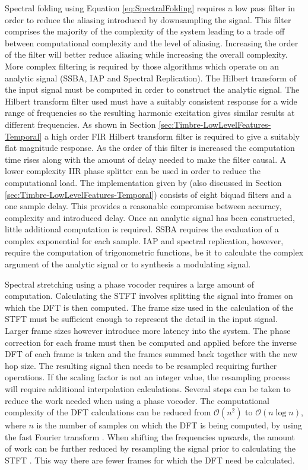 		Spectral folding using Equation \ref{eq:SpectralFolding} requires a low pass filter in order to reduce the
		aliasing introduced by downsampling the signal. This filter comprises the majority of the complexity of the
		system leading to a trade off between computational complexity and the level of aliasing. Increasing the
		order of the filter will better reduce aliasing while increasing the overall complexity. More complex
		filtering is required by those algorithms which operate on an analytic signal (SSBA, IAP and Spectral
		Replication). The Hilbert transform of the input signal must be computed in order to construct the analytic
		signal. The Hilbert transform filter used must have a suitably consistent response for a wide range of
		frequencies so the resulting harmonic excitation gives similar results at different frequencies. As shown
		in Section \ref{sec:Timbre-LowLevelFeatures-Temporal} a high order FIR Hilbert transform filter is required
		to give a suitably flat magnitude response. As the order of this filter is increased the computation time
		rises along with the amount of delay needed to make the filter causal. A lower complexity IIR phase
		splitter can be used in order to reduce the computational load. The implementation given by
		\citet{niemitalo2003hilbert} (also discussed in Section \ref{sec:Timbre-LowLevelFeatures-Temporal})
		consists of eight biquad filters and a one sample delay. This provides a reasonable compromise between
		accuracy, complexity and introduced delay.  Once an analytic signal has been constructed, little additional
		computation is required. SSBA requires the evaluation of a complex exponential for each sample. IAP and
		spectral replication, however, require the computation of trigonometric functions, be it to calculate the
		complex argument of the analytic signal or to synthesis a modulating signal.

		Spectral stretching using a phase vocoder requires a large amount of computation. Calculating the STFT
		involves splitting the signal into frames on which the DFT is then computed. The frame size used in the
		calculation of the STFT must be sufficient enough to represent the detail in the input signal. Larger frame
		sizes however introduce more latency into the system. The phase correction for each frame must then be
		computed and applied before the inverse DFT of each frame is taken and the frames summed back together with
		the new hop size. The resulting signal then needs to be resampled requiring further operations. If the
		scaling factor is not an integer value, the resampling process will require additional interpolation
		calculations. Several steps can be taken to reduce the work needed when using a phase vocoder. The
		computational complexity of the DFT calculations can be reduced from $\mathcal{O} \left( n^{2} \right)$ to
		$\mathcal{O}(n\log{n})$, where $n$ is the number of samples on which the DFT is being computed, by using
		the fast Fourier transform \citep{portnoff1976implementation}. When shifting the frequencies upwards, the
		amount of work can be further reduced by resampling the signal prior to calculating the STFT
		\citep{laroche1999new}. This way there are fewer frames for which the DFT need be calculated.

